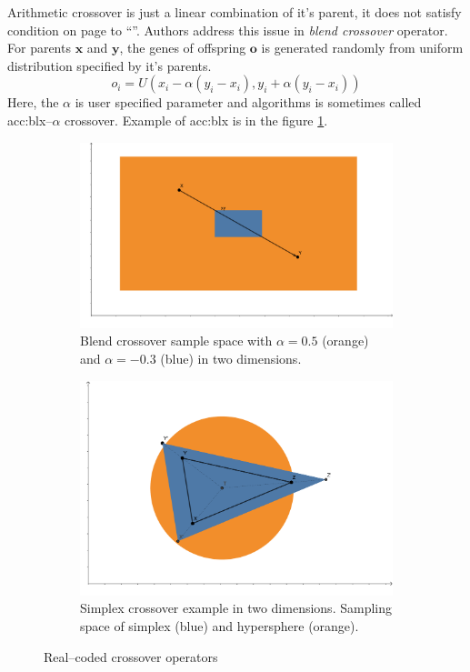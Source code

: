 Arithmetic crossover is just a linear combination of it's parent, it does not satisfy condition on page \pageref{enum:espopulationvariance} to \enquote{\snipescondition}. Authors \citeauthor*{BlendCrossoverOriginal} address this issue in \emph{blend crossover} operator. For parents $\mathbf{x}$ and $\mathbf{y}$, the genes of offspring $\mathbf{o}$ is generated randomly from uniform distribution specified by it's parents.
$$
o_i = U\left( 
    x_i - \alpha \left( y_i - x_i \right),
    y_i + \alpha \left( y_i - x_i \right)
\right)
$$
Here, the $\alpha$ is user specified parameter and algorithms is sometimes called \acrshort{acc:blx}--$\alpha$ crossover. Example of \acrshort{acc:blx} is in the figure \ref{fig:blendcrossoverexample}.

\begin{figure}
    \begin{subfigure}[t]{0.45\textwidth}
        \includegraphics[width=\textwidth]{img/BLX.pdf}
        \caption{Blend crossover sample space with $\alpha=0.5$ (orange) and $\alpha=-0.3$ (blue) in two dimensions.}
        \label{fig:blendcrossoverexample}
    \end{subfigure}
    \hfill
    \begin{subfigure}[t]{0.45\textwidth}
        \includegraphics[width=\textwidth]{img/SimplexCrossover.pdf}
        \caption{Simplex crossover example in two dimensions. Sampling space of simplex (blue) and hypersphere (orange).}
        \label{fig:simplexcrossoverexample}
    \end{subfigure}
    \caption{Real--coded crossover operators}
\end{figure}

